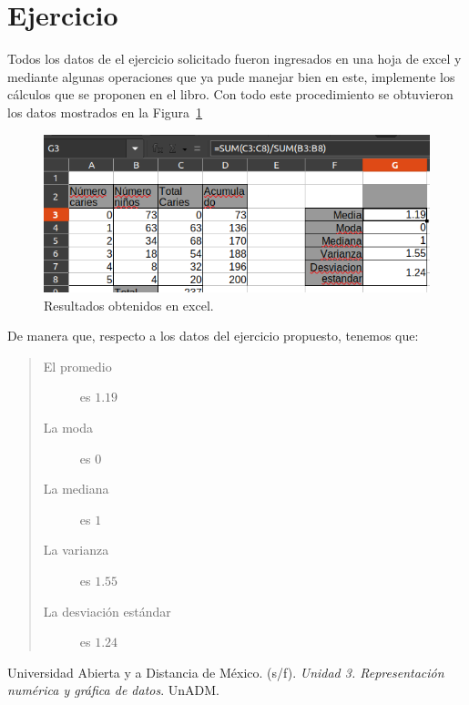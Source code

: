 \documentclass[12pt]{article}
\begin{document}
\newpage
\section*{Ejercicio}

	\par Todos los datos de el ejercicio solicitado fueron ingresados en una hoja de excel y mediante algunas operaciones que ya pude manejar bien en este, implemente los cálculos que se proponen en el libro. Con todo este procedimiento se obtuvieron los datos mostrados en la Figura~\ref{fig: excel}
	
	\begin{figure}[h]
		\centering
		\includegraphics[width=\textwidth]{u3-a3-1.png}
		\caption{Resultados obtenidos en excel.}
		\label{fig: excel}
	\end{figure}
	
	\par De manera que, respecto a los datos del ejercicio propuesto, tenemos que:
	\begin{quote}
		\begin{description}
			\item [El promedio] es $1.19$
			\item [La moda] es $0$
			\item [La mediana] es $1$
			\item [La varianza] es $1.55$
			\item [La desviación estándar] es $1.24$ 
		\end{description}
	\end{quote}
	





\begin{thebibliography}{X}
	 Universidad Abierta y a Distancia de México. (s/f). \textit{Unidad 3. Representación numérica y gráfica de datos}. UnADM.
 
\end{thebibliography}
\end{document}
